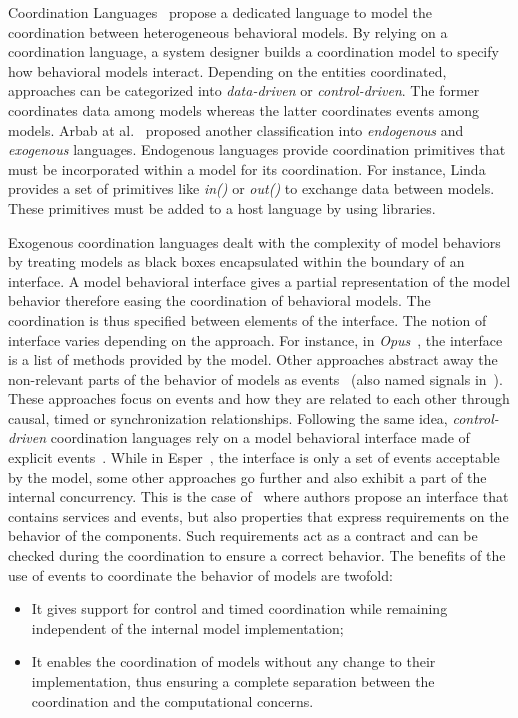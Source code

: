 Coordination Languages~\cite{coordsignibib} propose a dedicated language to model the coordination between heterogeneous behavioral models. By relying on a coordination language, a system designer builds a coordination model to specify how behavioral models interact. Depending on the entities coordinated, approaches can be categorized into \emph{data-driven} or \emph{control-driven}. The former coordinates data among models whereas the latter coordinates events among models. Arbab at al.~\cite{whatdocoord} proposed another classification into \emph{endogenous} and \emph{exogenous} languages. Endogenous languages provide coordination primitives that must be incorporated within a model for its coordination. For instance, Linda~\cite{lindabib} provides a set of primitives like \emph{in()} or \emph{out()} to exchange data between models. These primitives must be added to a host language by using libraries. 

Exogenous coordination languages dealt with the complexity of model behaviors by treating models as black boxes encapsulated within the boundary of an interface. A model behavioral interface gives a partial representation of the model behavior therefore easing the coordination of behavioral models. The coordination is thus specified between elements of the interface. The notion of interface varies depending on the approach. For instance, in \emph{Opus}~\cite{Opus}, the interface is a list of methods provided by the model. Other approaches abstract away the non-relevant parts of the behavior of models as events~\cite{eventStructures} (also named signals in~\cite{lee1998framework}). These approaches focus on events and how they are related to each other through causal, timed or synchronization relationships. Following the same idea, \emph{control-driven} coordination languages rely on a model behavioral interface made of explicit events~\cite{esperbib,manifoldbib,coordinainterfacebib}. While in Esper~\cite{esperbib}, the interface is only a set of events acceptable by the model, some other approaches go further and also exhibit a part of the internal concurrency. This is the case of~\cite{coordinainterfacebib} where authors propose an interface that contains services and events, but also properties that express requirements on the behavior of the components. Such requirements act as a contract and can be checked during the coordination to ensure a correct behavior. The benefits of the use of events to coordinate the behavior of models are twofold:
\begin{itemize}	
	\item It gives support for control and timed coordination while remaining independent of the internal model implementation;
	\item It enables the coordination of models without any change to their implementation, thus ensuring a complete separation between the coordination and the computational concerns.
\end{itemize}

